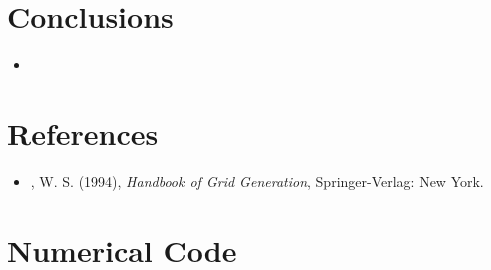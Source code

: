 \documentclass{article}
\begin{document}
\section{Conclusions}
\begin{itemize}
\item 
\end{itemize}

\section{References}

\begin{itemize}
    \item , W. S. (1994), \textit{Handbook of Grid Generation}, Springer-Verlag: New York.
\end{itemize}

\section{Numerical Code}
\begin{lstlisting}[title={}]

\end{lstlisting}
\end{document}
